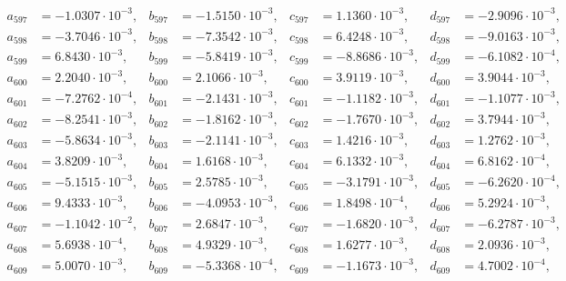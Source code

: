 \begin{align*}
  a_{ 597 } &= -1.0307 \cdot 10^{ -3 }, & b_{ 597 } &= -1.5150 \cdot 10^{ -3 }, & c_{ 597 } &= 1.1360 \cdot 10^{ -3 }, & d_{ 597 } &= -2.9096 \cdot 10^{ -3 }, \\ 
  a_{ 598 } &= -3.7046 \cdot 10^{ -3 }, & b_{ 598 } &= -7.3542 \cdot 10^{ -3 }, & c_{ 598 } &= 6.4248 \cdot 10^{ -3 }, & d_{ 598 } &= -9.0163 \cdot 10^{ -3 }, \\ 
  a_{ 599 } &= 6.8430 \cdot 10^{ -3 }, & b_{ 599 } &= -5.8419 \cdot 10^{ -3 }, & c_{ 599 } &= -8.8686 \cdot 10^{ -3 }, & d_{ 599 } &= -6.1082 \cdot 10^{ -4 }, \\ 
  a_{ 600 } &= 2.2040 \cdot 10^{ -3 }, & b_{ 600 } &= 2.1066 \cdot 10^{ -3 }, & c_{ 600 } &= 3.9119 \cdot 10^{ -3 }, & d_{ 600 } &= 3.9044 \cdot 10^{ -3 }, \\ 
  a_{ 601 } &= -7.2762 \cdot 10^{ -4 }, & b_{ 601 } &= -2.1431 \cdot 10^{ -3 }, & c_{ 601 } &= -1.1182 \cdot 10^{ -3 }, & d_{ 601 } &= -1.1077 \cdot 10^{ -3 }, \\ 
  a_{ 602 } &= -8.2541 \cdot 10^{ -3 }, & b_{ 602 } &= -1.8162 \cdot 10^{ -3 }, & c_{ 602 } &= -1.7670 \cdot 10^{ -3 }, & d_{ 602 } &= 3.7944 \cdot 10^{ -3 }, \\ 
  a_{ 603 } &= -5.8634 \cdot 10^{ -3 }, & b_{ 603 } &= -2.1141 \cdot 10^{ -3 }, & c_{ 603 } &= 1.4216 \cdot 10^{ -3 }, & d_{ 603 } &= 1.2762 \cdot 10^{ -3 }, \\ 
  a_{ 604 } &= 3.8209 \cdot 10^{ -3 }, & b_{ 604 } &= 1.6168 \cdot 10^{ -3 }, & c_{ 604 } &= 6.1332 \cdot 10^{ -3 }, & d_{ 604 } &= 6.8162 \cdot 10^{ -4 }, \\ 
  a_{ 605 } &= -5.1515 \cdot 10^{ -3 }, & b_{ 605 } &= 2.5785 \cdot 10^{ -3 }, & c_{ 605 } &= -3.1791 \cdot 10^{ -3 }, & d_{ 605 } &= -6.2620 \cdot 10^{ -4 }, \\ 
  a_{ 606 } &= 9.4333 \cdot 10^{ -3 }, & b_{ 606 } &= -4.0953 \cdot 10^{ -3 }, & c_{ 606 } &= 1.8498 \cdot 10^{ -4 }, & d_{ 606 } &= 5.2924 \cdot 10^{ -3 }, \\ 
  a_{ 607 } &= -1.1042 \cdot 10^{ -2 }, & b_{ 607 } &= 2.6847 \cdot 10^{ -3 }, & c_{ 607 } &= -1.6820 \cdot 10^{ -3 }, & d_{ 607 } &= -6.2787 \cdot 10^{ -3 }, \\ 
  a_{ 608 } &= 5.6938 \cdot 10^{ -4 }, & b_{ 608 } &= 4.9329 \cdot 10^{ -3 }, & c_{ 608 } &= 1.6277 \cdot 10^{ -3 }, & d_{ 608 } &= 2.0936 \cdot 10^{ -3 }, \\ 
  a_{ 609 } &= 5.0070 \cdot 10^{ -3 }, & b_{ 609 } &= -5.3368 \cdot 10^{ -4 }, & c_{ 609 } &= -1.1673 \cdot 10^{ -3 }, & d_{ 609 } &= 4.7002 \cdot 10^{ -4 }, \\ 

\end{align*}
